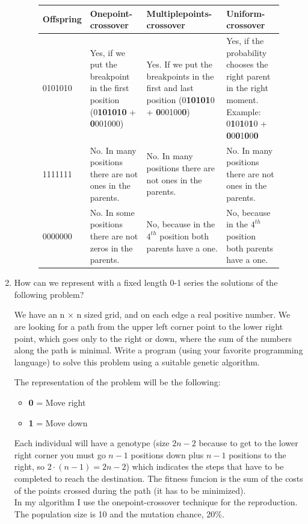 \documentclass[12pt,english]{article}
\begin{document}
\begin{enumerate}
	\begin{figure}[H]
	\centering
		\begin{tabular}{|m{3cm}|m{4cm}|m{4cm}|m{4cm}|}
		\hline
			\textbf{Offspring} & \textbf{Onepoint-crossover} & \textbf{Multiplepoints-crossover} & \textbf{Uniform-crossover}\\
			\hline
			 0101010 & Yes, if we put the breakpoint in the first position (0\textbf{101010} + \textbf{0}001000)& Yes. If we put the breakpoints in the first and last position (0\textbf{10101}0 + \textbf{0}00100\textbf{0}) & Yes, if the probability chooses the right parent in the right moment. Example: 0\textbf{1}0\textbf{1}0\textbf{1}0 + \textbf{0}0\textbf{0}1\textbf{0}0\textbf{0} \\
			 \hline
			 1111111 & No. In many positions there are not ones in the parents.& No. In many positions there are not ones in the parents.& No. In many positions there are not ones in the parents.\\
			 \hline
			 0000000 & No. In some positions there are not zeros in the parents. & No, because in the $4^{th}$ position both parents have a one.& No, because in the $4^{th}$ position both parents have a one.\\
			 \hline
		\end{tabular}
	\end{figure}

\newpage

	\item How can we represent with a fixed length 0-1 series the solutions of the following problem?

	We have an n × n sized grid, and on each edge a real positive number.
	We are looking for a path from the upper left corner point to the lower
	right point, which goes only to the right or down, where the sum of the numbers along the path is minimal. Write a program (using your favorite programming language) to solve this problem using a suitable genetic algorithm.

	The representation of the problem will be the following:
	\begin{itemize}
		\item \textbf{0} = Move right
		\item \textbf{1} = Move down
	\end{itemize}
	Each individual will have a genotype (size $2n - 2$ because to get to the lower right corner you must go $n-1$ positions down plus $n-1$ positions to the right, so $2\cdot(n-1)=2n-2$) which indicates the steps that have to be completed to reach the destination. The fitness funcion is the sum of the costs of the points crossed during the path (it has to be minimized).\\

	In my algorithm I use the onepoint-crossover technique for the reproduction. The population size is 10 and the mutation chance, 20\%.

\end{enumerate}
\end{document}
